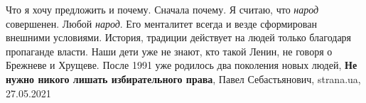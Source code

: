  
 
 
 
 
Что я хочу предложить и почему. Сначала почему. Я считаю, что \emph{народ} совершенен.
Любой \emph{народ}. Его менталитет всегда и везде сформирован внешними условиями.
История, традиции действует на людей только благодаря пропаганде власти. Наши
дети уже не знают, кто такой Ленин, не говоря о Брежневе и Хрущеве. После 1991
уже родилось два поколения новых людей, \textbf{Не нужно никого лишать избирательного права},
Павел Себастьянович, strana.ua, 27.05.2021
